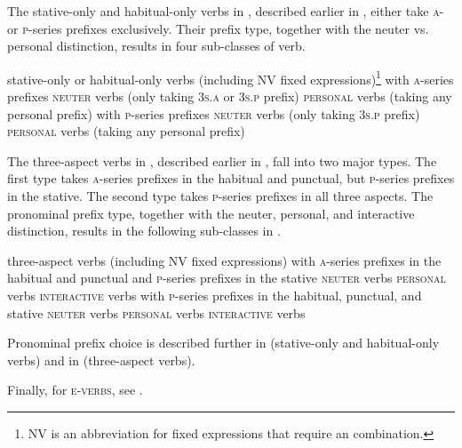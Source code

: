 The stative-only and habitual-only verbs in , described earlier in , either take \textsc{a}- or \textsc{p}-series prefixes exclusively. Their prefix type, together with the neuter vs. personal distinction, results in four sub-classes of verb.

\ea\label{ex:verbex361} stative-only or habitual-only verbs (including \textsc{NV} fixed expressions)\footnote{\textsc{NV} is an abbreviation for fixed expressions that require an  combination.}
\ea with \textsc{a}-series prefixes
\ea \textsc{neuter} verbs (only taking  \textsc{3s.a} or  \textsc{3s.p} prefix)
\ex \textsc{personal} verbs (taking any personal prefix)
\z
\ex with \textsc{p}-series prefixes
\ea \textsc{neuter} verbs (only taking  \textsc{3s.p} prefix)
\ex \textsc{personal} verbs (taking any personal prefix)
\z
\z
\z

The three-aspect verbs in , described earlier in , fall into two major types. The first type  takes \textsc{a}-series prefixes in the habitual and punctual, but \textsc{p}-series prefixes in the stative. The second type  takes \textsc{p}-series prefixes in all three aspects. The pronominal prefix type, together with the neuter, personal, and interactive distinction, results in the following sub-classes in . 

\ea\label{ex:verbex362} three-aspect verbs (including \textsc{NV} fixed expressions)
\ea with \textsc{a}-series prefixes in the habitual and punctual and \textsc{p}-series prefixes in the stative\label{ex:verbex362a}
\ea \textsc{neuter} verbs
\ex \textsc{personal} verbs
\ex \textsc{interactive} verbs
\z
\ex with \textsc{p}-series prefixes in the habitual, punctual, and stative\label{ex:verbex362b}
\ea \textsc{neuter} verbs 
\ex \textsc{personal} verbs
\ex \textsc{interactive} verbs
\z
\z 
\z

Pronominal prefix choice is described further in  (stative-only and habitual-only verbs) and in  (three-aspect verbs).

Finally, for \textsc{e-verbs}, see . 


